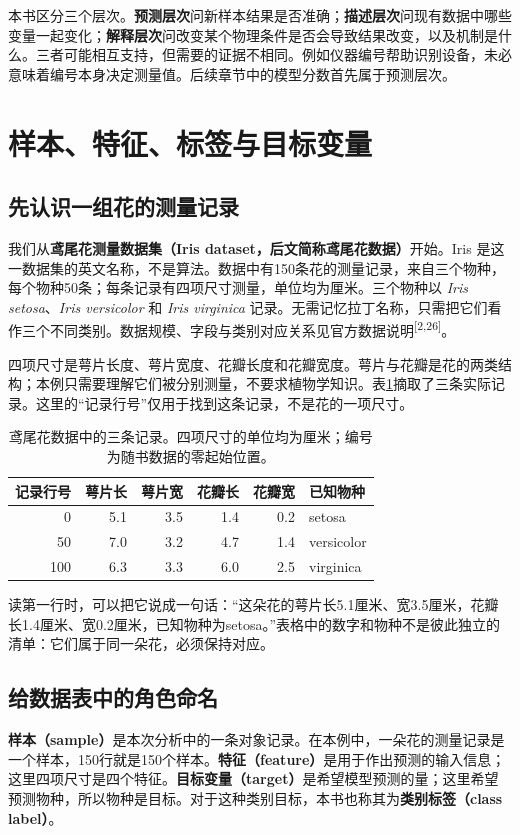 本书区分三个层次。\textbf{预测层次}问新样本结果是否准确；\textbf{描述层次}问现有数据中哪些变量一起变化；\textbf{解释层次}问改变某个物理条件是否会导致结果改变，以及机制是什么。三者可能相互支持，但需要的证据不相同。例如仪器编号帮助识别设备，未必意味着编号本身决定测量值。后续章节中的模型分数首先属于预测层次。

\section{样本、特征、标签与目标变量}
\label{sec:iris-intro}
\subsection{先认识一组花的测量记录}
我们从\textbf{鸢尾花测量数据集（Iris dataset，后文简称鸢尾花数据）}开始。Iris 是这一数据集的英文名称，不是算法。数据中有150条花的测量记录，来自三个物种，每个物种50条；每条记录有四项尺寸测量，单位均为厘米。三个物种以 \textit{Iris setosa}、\textit{Iris versicolor} 和 \textit{Iris virginica} 记录。无需记忆拉丁名称，只需把它们看作三个不同类别。数据规模、字段与类别对应关系见官方数据说明\textsuperscript{[2,26]}。

四项尺寸是萼片长度、萼片宽度、花瓣长度和花瓣宽度。萼片与花瓣是花的两类结构；本例只需要理解它们被分别测量，不要求植物学知识。表\ref{tab:iris-records}摘取了三条实际记录。这里的“记录行号”仅用于找到这条记录，不是花的一项尺寸。

\begin{table}[htbp]\centering\small
\caption{鸢尾花数据中的三条记录。四项尺寸的单位均为厘米；编号为随书数据的零起始位置。}\label{tab:iris-records}
\begin{tabular}{rrrrrl}\toprule
记录行号&萼片长&萼片宽&花瓣长&花瓣宽&已知物种\\\midrule
0&5.1&3.5&1.4&0.2&setosa\\
50&7.0&3.2&4.7&1.4&versicolor\\
100&6.3&3.3&6.0&2.5&virginica\\\bottomrule
\end{tabular}
\end{table}

读第一行时，可以把它说成一句话：“这朵花的萼片长5.1厘米、宽3.5厘米，花瓣长1.4厘米、宽0.2厘米，已知物种为setosa。”表格中的数字和物种不是彼此独立的清单：它们属于同一朵花，必须保持对应。

\subsection{给数据表中的角色命名}
\textbf{样本（sample）}是本次分析中的一条对象记录。在本例中，一朵花的测量记录是一个样本，150行就是150个样本。\textbf{特征（feature）}是用于作出预测的输入信息；这里四项尺寸是四个特征。\textbf{目标变量（target）}是希望模型预测的量；这里希望预测物种，所以物种是目标。对于这种类别目标，本书也称其为\textbf{类别标签（class label）}。

